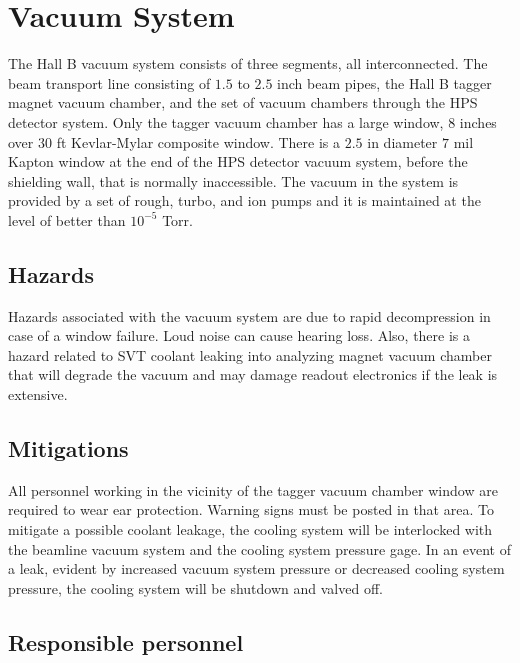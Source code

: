\documentclass[11pt]{report}
\begin{document}
\section{Vacuum System}

\indent

The Hall B vacuum system consists of three segments, all interconnected. The beam transport line consisting of $1.5$ to $2.5$ inch beam pipes, the Hall B tagger magnet vacuum chamber, and the set of vacuum chambers through the HPS detector system. Only the tagger vacuum chamber has a large window, $8$ inches over $30$ ft Kevlar-Mylar composite window. There is a $2.5$ in diameter $7$ mil Kapton window at the end of the HPS detector vacuum system, before the shielding wall, that is normally inaccessible. The vacuum in the system is provided by a set of rough, turbo, and ion pumps and it is maintained at the level of better than $10^{-5}$ Torr. 

\subsection{Hazards} 

\indent

Hazards associated with the vacuum system are due to rapid decompression in case of a window failure. Loud noise can cause hearing loss. Also, there is a hazard related to SVT coolant leaking into analyzing magnet vacuum chamber that will degrade the vacuum and may damage readout electronics if the leak is extensive.

\subsection{Mitigations}

\indent

All personnel working in the vicinity of the tagger vacuum chamber window are required to wear ear protection. Warning signs must be posted in that area. To mitigate a possible coolant leakage, the cooling system will be interlocked with the beamline vacuum system and the cooling system pressure gage. In an event of a leak, evident by increased vacuum system pressure or decreased cooling system pressure, the cooling system will be shutdown and valved off. 

\subsection{Responsible personnel}
\end{document}
